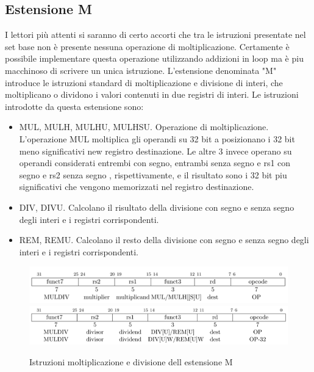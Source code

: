 \documentclass[12pt,a4paper]{report}
\begin{document}
\subsection{Estensione M}
I lettori più attenti si saranno di certo accorti che tra le istruzioni presentate nel set base non è presente nessuna operazione di moltiplicazione. Certamente è possibile implementare questa operazione utilizzando addizioni in loop ma è piu macchinoso di scrivere un unica istruzione. L'estensione denominata "M" introduce le istruzioni standard di moltiplicazione e divisione di interi, che moltiplicano o dividono i valori contenuti in due registri di interi. Le istruzioni introdotte da questa estensione sono:
\begin{itemize}
\item MUL, MULH, MULHU, MULHSU.  Operazione di moltiplicazione. L'operazione MUL moltiplica gli operandi su 32 bit a posizionano i 32 bit meno significativi new registro destinazione. Le altre 3 invece operano su operandi considerati entrembi con segno, entrambi senza segno e rs1 con segno e rs2 senza segno , rispettivamente, e il risultato sono i 32 bit piu significativi che vengono memorizzati nel registro destinazione.
\item DIV, DIVU. Calcolano il risultato della divisione con segno e senza segno degli interi e i registri corrispondenti.
\item REM, REMU. Calcolano il resto della divisione con segno e senza segno degli interi e i registri corrispondenti.
\end{itemize}
\begin{figure}
	\includegraphics[width = \textwidth]{Istruzioni/IstruzioniM/Istruction1_M.png}
	\includegraphics[width = \textwidth]{Istruzioni/IstruzioniM/Istruction2_M.png}
	\caption{Istruzioni moltiplicazione e divisione dell estensione M}
	\label{Fig:IstruzioniM}
\end{figure}
\end{document}
